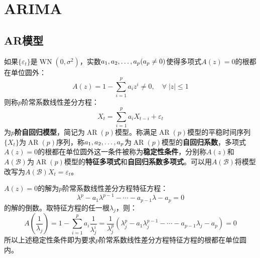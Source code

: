 \section{ARIMA}
\subsection{AR模型}
\begin{definition}
	如果$\{\varepsilon_t\}$是$\operatorname{WN}(0,\sigma^2)$，实数$a_1, a_2, \dots, a_{p}(a_p\ne0)$使得多项式$A(z)=0$的根都在单位圆外：
	\begin{equation*}
		A(z)=1-\sum_{i=1}^{p}a_iz^i\ne0,\quad\forall\;|z|\leqslant1
	\end{equation*}
	则称$p$阶常系数线性差分方程：
	\begin{equation*}
		X_t=\sum_{i=1}^{p}a_iX_{t-i}+\varepsilon_t
	\end{equation*}
	为$p$\textbf{阶自回归模型}，简记为$\operatorname{AR}(p)$模型。称满足$\operatorname{AR}(p)$模型的平稳时间序列$\{X_t\}$为$\operatorname{AR}(p)$序列，称$a_1, a_2, \dots, a_{p}$为$\operatorname{AR}(p)$模型的\textbf{自回归系数}，多项式$A(z)=0$的根都在单位圆外这一条件被称为\textbf{稳定性条件}，分别称$A(z)$和$A(\mathcal{B})$为$\operatorname{AR}(p)$模型的\textbf{特征多项式}和\textbf{自回归系数多项式}。可以用$A(\mathcal{B})$将模型改写为$A(\mathcal{B})X_t=\varepsilon_t$。
\end{definition}
\begin{derivation}
	$A(z)=0$的解为$p$阶常系数线性差分方程特征方程：
	\begin{equation*}
		\lambda^p-a_1\lambda^{p-1}-\cdots-a_{p-1}\lambda-a_p=0
	\end{equation*}
	的解的倒数。取特征方程的任一根$\lambda_j$，则：
	\begin{equation*}
		A\left(\frac{1}{\lambda_j}\right)=1-\sum_{i=1}^{p}a_i\frac{1}{\lambda_j^i}=\frac{1}{\lambda_j^p}(\lambda_j^p-a_1\lambda_j^{p-1}-\cdots-a_{p-1}\lambda_j-a_{p})=0
	\end{equation*}
	所以上述稳定性条件即为要求$p$阶常系数线性差分方程特征方程的根都在单位圆内。
\end{derivation}
